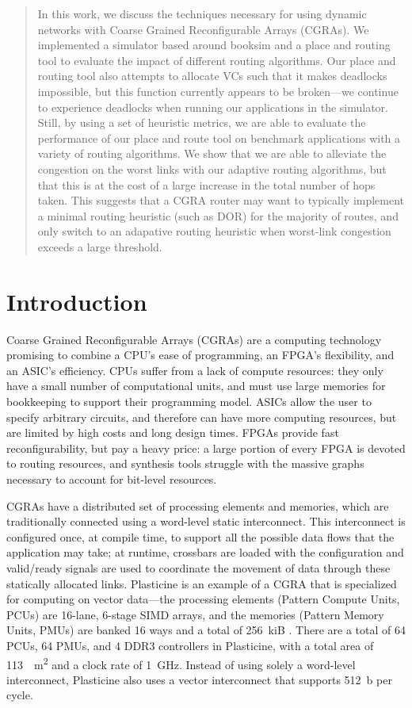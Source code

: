\begin{abstract}
  In this work, we discuss the techniques necessary for using dynamic networks with Coarse Grained Reconfigurable Arrays (CGRAs). We implemented a simulator based around booksim and a place and routing tool to evaluate the impact of different routing algorithms. Our place and routing tool also attempts to allocate VCs such that it makes deadlocks impossible, but this function currently appears to be broken---we continue to experience deadlocks when running our applications in the simulator. Still, by using a set of heuristic metrics, we are able to evaluate the performance of our place and route tool on benchmark applications with a variety of routing algorithms. We show that we are able to alleviate the congestion on the worst links with our adaptive routing algorithms, but that this is at the cost of a large increase in the total number of hops taken. This suggests that a CGRA router may want to typically implement a minimal routing heuristic (such as DOR) for the majority of routes, and only switch to an adapative routing heuristic when worst-link congestion exceeds a large threshold.

\end{abstract}
\section{Introduction}
\label{sec:intro}

Coarse Grained Reconfigurable Arrays (CGRAs) are a computing technology promising to combine a CPU's ease of programming, an FPGA's flexibility, and an ASIC's efficiency.
CPUs suffer from a lack of compute resources: they only have a small number of computational units, and must use large memories for bookkeeping to support their programming model.
ASICs allow the user to specify arbitrary circuits, and therefore can have more computing resources, but are limited by high costs and long design times.
FPGAs provide fast reconfigurability, but pay a heavy price: a large portion of every FPGA is devoted to routing resources, and synthesis tools struggle with the massive graphs necessary to account for bit-level resources.

CGRAs have a distributed set of processing elements and memories, which are traditionally connected using a word-level static interconnect.
This interconnect is configured once, at compile time, to support all the possible data flows that the application may take; at runtime, crossbars are loaded with the configuration and valid/ready signals are used to coordinate the movement of data through these statically allocated links.
Plasticine is an example of a CGRA that is specialized for computing on vector data---the processing elements (Pattern Compute Units, PCUs) are 16-lane, 6-stage SIMD arrays, and the memories (Pattern Memory Units, PMUs) are banked 16 ways and a total of \SI{256}{kiB} \cite{plasticine}.
There are a total of 64 PCUs, 64 PMUs, and 4 DDR3 controllers in Plasticine, with a total area of \SI{113}{\mu m^2} and a clock rate of \SI{1}{GHz}.
Instead of using solely a word-level interconnect, Plasticine also uses a vector interconnect that supports \SI{512}{b} per cycle.

